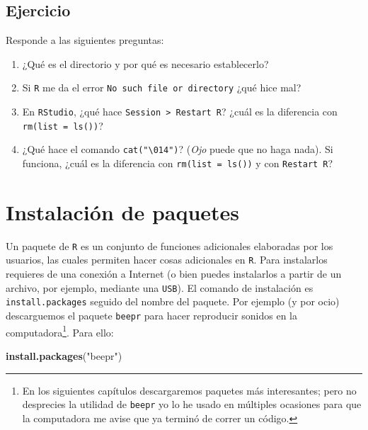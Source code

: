 \documentclass[
]{book}
\newenvironment{Shaded}{\begin{snugshade}}{\end{snugshade}}
\newcommand{\KeywordTok}[1]{\textcolor[rgb]{0.13,0.29,0.53}{\textbf{#1}}}
\newcommand{\NormalTok}[1]{#1}
\newcommand{\StringTok}[1]{\textcolor[rgb]{0.31,0.60,0.02}{#1}}
\begin{document}
\hypertarget{ejercicio-2}{%
\subsection{Ejercicio}\label{ejercicio-2}}

Responde a las siguientes preguntas:

\begin{enumerate}
\def\labelenumi{\arabic{enumi}.}
\item
  ¿Qué es el directorio y por qué es necesario establecerlo?
\item
  Si \texttt{R} me da el error \texttt{\textquotesingle{}No\ such\ file\ or\ directory\textquotesingle{}} ¿qué hice mal?
\item
  En \texttt{RStudio}, ¿qué hace \texttt{Session\ \textgreater{}\ Restart\ R}? ¿cuál es la diferencia con \texttt{rm(list\ =\ ls())}?
\item
  ¿Qué hace el comando \texttt{cat("\textbackslash{}014")}? (\emph{Ojo} puede que no haga nada). Si funciona, ¿cuál es la diferencia con \texttt{rm(list\ =\ ls())} y con \texttt{Restart\ R}?
\end{enumerate}

\hypertarget{instalaciuxf3n-de-paquetes}{%
\section{Instalación de paquetes}\label{instalaciuxf3n-de-paquetes}}

Un paquete de \texttt{R} es un conjunto de funciones adicionales elaboradas por los usuarios, las cuales permiten hacer cosas adicionales en \texttt{R}. Para instalarlos requieres de una conexión a Internet (o bien puedes instalarlos a partir de un archivo, por ejemplo, mediante una \texttt{USB}). El comando de instalación es \texttt{install.packages} seguido del nombre del paquete. Por ejemplo (y por ocio) descarguemos el paquete \texttt{beepr} para hacer reproducir sonidos en la computadora\footnote{En los siguientes capítulos descargaremos paquetes más interesantes; pero no desprecies la utilidad de \texttt{beepr} yo lo he usado en múltiples ocasiones para que la computadora me avise que ya terminó de correr un código.}. Para ello:

\begin{Shaded}
\begin{Highlighting}[]
\KeywordTok{install.packages}\NormalTok{(}\StringTok{"beepr"}\NormalTok{)}
\end{Highlighting}
\end{Shaded}
\end{document}
